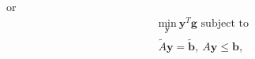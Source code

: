 or 
\begin{equation}\begin{matrix}
	\underset{\mathbf{y}}{\text{min}} \ \mathbf{y}^T\mathbf{g} \text{ subject to } \\
	\tilde{A}\mathbf{y} = \tilde{\mathbf{b}}, \ A\mathbf{y} \le \mathbf{b},
\end{matrix} \end{equation}

